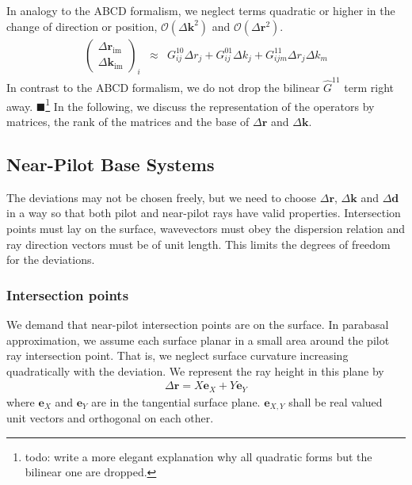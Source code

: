 \documentclass[12pt,a4paper,twoside,openright,BCOR10mm,headsepline,titlepage,abstracton,chapterprefix,final]{scrreprt}
\newcommand\Vector[1]{{\mathbf{#1}}}
\newcommand\wavenumber{k}
\newcommand\Wavevector{\Vector{\wavenumber}}
\newcommand{\remark}[1]{{\color{red}$\blacksquare$}\footnote{{\color{red}#1}}}
\newcommand{\orderof}[1]{\mathcal{O}(#1)}
\newcommand\im{\textrm{im}}
\begin{document}
In analogy to the ABCD formalism, we neglect terms quadratic or higher in the change of direction or position, 
$\orderof{\Delta\Wavevector^2}$ and $\orderof{\Delta\Vector{r}^2}$.
\begin{eqnarray}
 \begin{pmatrix}
  \Delta \Vector{r}_\im \\ \Delta \Wavevector_\im
 \end{pmatrix}_i
 &\approx&
   G^{10}_{ij} \Delta r_j
 + G^{01}_{ij} \Delta k_j
 + G^{11}_{ijm} \Delta r_j \Delta k_m
\end{eqnarray}
In contrast to the ABCD formalism, we do not drop the bilinear $\hat{G}^{11}$ term right away.
\remark{todo: write a more elegant explanation why all quadratic forms but the bilinear one are dropped.}
In the following, we discuss the representation of the operators by matrices, 
the rank of the matrices and the base of $\Delta \Vector{r}$ and $\Delta \Wavevector$.

\subsection{Near-Pilot Base Systems}

The deviations may not be chosen freely, but we need to choose
$\Delta\Vector{r}$, $\Delta\Wavevector$ and $\Delta\Vector{d}$ 
in a way so that both pilot and near-pilot rays
have valid properties.
Intersection points must lay on the surface,
wavevectors must obey the dispersion relation 
and ray direction vectors must be of unit length.
This limits the degrees of freedom for the deviations.

\subsubsection{Intersection points}

We demand that near-pilot intersection points are on the surface.
In parabasal approximation, we assume each surface planar in a small area around the pilot ray intersection point.
That is, we neglect surface curvature increasing quadratically with the deviation. 
We represent the ray height in this plane by
\begin{eqnarray}
 \Delta\Vector{r} = X \Vector{e}_{X} + Y \Vector{e}_{Y}
 \label{eq:deltaR_equals_XY}
\end{eqnarray}
where $\Vector{e}_{X}$ and $\Vector{e}_{Y}$ are in the tangential surface plane.
$\Vector{e}_{X,Y}$ shall be real valued unit vectors and orthogonal on each other.
\end{document}
